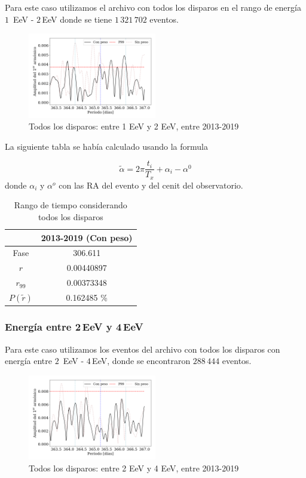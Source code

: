 Para este caso utilizamos el archivo con todos los disparos en el rango de energía $1\,$ EeV - $2\,$EeV donde se tiene $1\,321\,702$ eventos.

\begin{figure}[H]
	\centering
	\includegraphics[width=0.5\textwidth]{Graficos/2019_AllTriggers_1_2_EeV_con_vs_sin_peso.png}
	\caption{Todos los disparos: entre 1 EeV y 2 EeV, entre 2013-2019}
	\label{fig:12w}
\end{figure}


La siguiente tabla se había calculado usando la formula 

\begin{equation}
	\tilde \alpha = 2\pi \frac{t_i}{T_x} +\alpha_i - \alpha^0
\end{equation}
donde $\alpha_i$ y $\alpha^o$ con las RA del evento y del cenit del observatorio.

	\begin{table}[H]
	\centering
		\begin{tabular}{c|c}
	 		&  2013-2019 (Con peso)	 \\ \hline
	Fase		& 	306.611				 \\
	$r$ 		&  0.00440897			\\
	$r_{99}$ 	&  0.00373348			\\
	$P(\tilde r)$ 	    & 	0.162485	\%	 \\
		\end{tabular}
	\caption{Rango de tiempo considerando todos los disparos} 	\label{rango_corto}
	\end{table}


\subsubsection{Energía entre 2\,EeV y 4\,EeV}

Para este caso utilizamos los eventos del archivo con todos los disparos con energía entre $2\,$ EeV - $4\,$EeV, donde se encontraron $288\,444$ eventos.
\begin{figure}[H]
	\centering
	\includegraphics[width=0.5\textwidth]{Graficos/2019_AllTriggers_2_4_EeV_con_vs_sin_peso.png}
	\caption{Todos los disparos: entre 2 EeV y 4 EeV, entre 2013-2019}
	\label{fig:24w}
\end{figure}

